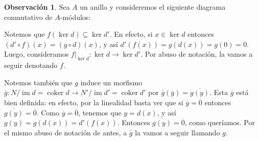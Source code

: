 \documentclass[12pt]{book}
\theoremstyle{definition}
\newtheorem{obs}[teo]{Observación}
\DeclareMathOperator{\im}{im}
\DeclareMathOperator{\coker}{coker}
\begin{document}
\begin{obs}
Sea $A$ un anillo y consideremos el siguiente diagrama conmutativo de $A$-módulos: \begin{center}\end{center}

Notemos que $f(\ker d)\subseteq \ker d'$. En efecto, si $x\in \ker d$ entonces $(d'\circ f)(x) = (g\circ d)(x)$, y así $d'(f(x)) = g(d(x))=g(0)=0$. Luego, consideramos $\left. f\right|_{\ker d}:\ker d\to \ker d'$. Por abuso de notación, la vamos a seguir denotando $f$.

Notemos también que $g$ induce un morfismo $\overline{g}:N/\im d = \coker d\to N'/\im d' = \coker d'$ por $\overline{g}(\overline{y})=\overline{g(y)}$. Esta $\overline{g}$ está bien definida: en efecto, por la linealidad basta ver que si $\overline{y}=\overline{0}$ entonces $\overline{g(y)}=\overline{0}$. Como $\overline{y}=\overline{0}$, tenemos que $y=d(x)$, y  así $g(y)=g(d(x)) = d'(f(x))$. Entonces $\overline{g(y)}=\overline{0}$, como queríamos. Por el mismo abuso de notación de antes, a $\overline{g}$ la vamos a seguir llamando $g$.
\end{obs}
\end{document}
